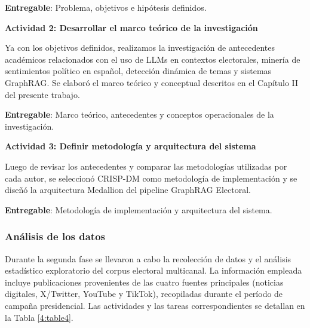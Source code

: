 \textbf{Entregable}: Problema, objetivos e hipótesis definidos.
 
\textbf{Actividad 2: Desarrollar el marco teórico de la investigación}
 
Ya con los objetivos definidos, realizamos la investigación de antecedentes académicos relacionados con el uso de LLMs en contextos electorales, minería de sentimientos político en español, detección dinámica de temas y sistemas GraphRAG. Se elaboró el marco teórico y conceptual descritos en el Capítulo II del presente trabajo.
 
\textbf{Entregable}: Marco teórico, antecedentes y conceptos operacionales de la investigación.
 
\textbf{Actividad 3: Definir metodología y arquitectura del sistema}
 
Luego de revisar los antecedentes y comparar las metodologías utilizadas por cada autor, se seleccionó CRISP-DM como metodología de implementación y se diseñó la arquitectura Medallion del pipeline GraphRAG Electoral.
 
\textbf{Entregable}: Metodología de implementación y arquitectura del sistema.
 
\subsubsection{Análisis de los datos}
 
Durante la segunda fase se llevaron a cabo la recolección de datos y el análisis estadístico exploratorio del corpus electoral multicanal. La información empleada incluye publicaciones provenientes de las cuatro fuentes principales (noticias digitales, X/Twitter, YouTube y TikTok), recopiladas durante el período de campaña presidencial. Las actividades y las tareas correspondientes se detallan en la Tabla \ref{4:table4}.
 
